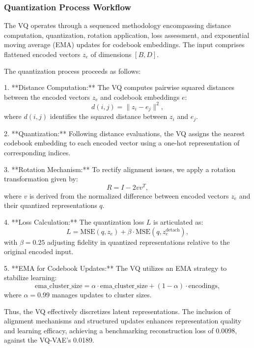 \subsubsection{Quantization Process Workflow}
The VQ operates through a sequenced methodology encompassing distance computation, quantization, rotation application, loss assessment, and exponential moving average (EMA) updates for codebook embeddings. The input comprises flattened encoded vectors \(z_e\) of dimensions \([B, D]\).

The quantization process proceeds as follows:

1. **Distance Computation:** The VQ computes pairwise squared distances between the encoded vectors \(z_e\) and codebook embeddings \(e\):
   \begin{equation}
   d(i, j) = \| z_i - e_j \|^2,
   \end{equation}
   where \(d(i, j)\) identifies the squared distance between \(z_i\) and \(e_j\).
  
2. **Quantization:** Following distance evaluations, the VQ assigns the nearest codebook embedding to each encoded vector using a one-hot representation of corresponding indices.

3. **Rotation Mechanism:** To rectify alignment issues, we apply a rotation transformation given by:
   \begin{equation}
   R = I - 2 vv^T,
   \end{equation}
   where \(v\) is derived from the normalized difference between encoded vectors \(z_e\) and their quantized representations \(q\).

4. **Loss Calculation:** The quantization loss \(L\) is articulated as:
   \begin{equation}
   L = \text{MSE}(q, z_e) + \beta \cdot \text{MSE}(q, z_e^{\text{detach}}),
   \end{equation}
   with \(\beta = 0.25\) adjusting fidelity in quantized representations relative to the original encoded input.

5. **EMA for Codebook Updates:** The VQ utilizes an EMA strategy to stabilize learning:
   \begin{equation}
   \text{ema\_cluster\_size} = \alpha \cdot \text{ema\_cluster\_size} + (1 - \alpha) \cdot \text{encodings},
   \end{equation}
   where \(\alpha = 0.99\) manages updates to cluster sizes.

Thus, the VQ effectively discretizes latent representations. The inclusion of alignment mechanisms and structured updates enhances representation quality and learning efficacy, achieving a benchmarking reconstruction loss of 0.0098, against the VQ-VAE's 0.0189.

